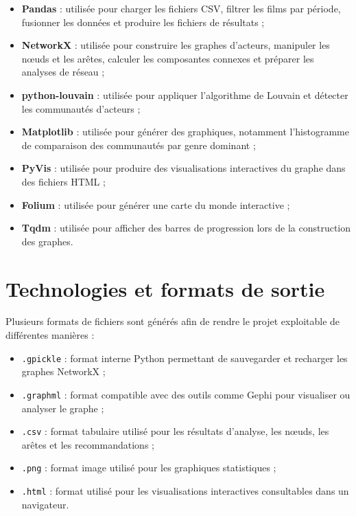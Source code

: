 \documentclass[11pt,a4paper,oneside,openany]{report}
\begin{document}
\begin{itemize}
    \item \textbf{Pandas} : utilisée pour charger les fichiers CSV, filtrer les films par période, fusionner les données et produire les fichiers de résultats ;
    \item \textbf{NetworkX} : utilisée pour construire les graphes d’acteurs, manipuler les nœuds et les arêtes, calculer les composantes connexes et préparer les analyses de réseau ;
    \item \textbf{python-louvain} : utilisée pour appliquer l’algorithme de Louvain et détecter les communautés d’acteurs ;
    \item \textbf{Matplotlib} : utilisée pour générer des graphiques, notamment l’histogramme de comparaison des communautés par genre dominant ;
    \item \textbf{PyVis} : utilisée pour produire des visualisations interactives du graphe dans des fichiers HTML ;
    \item \textbf{Folium} : utilisée pour générer une carte du monde interactive ;
    \item \textbf{Tqdm} : utilisée pour afficher des barres de progression lors de la construction des graphes.
\end{itemize}

\section{Technologies et formats de sortie}

Plusieurs formats de fichiers sont générés afin de rendre le projet exploitable de différentes manières :

\begin{itemize}
    \item \texttt{.gpickle} : format interne Python permettant de sauvegarder et recharger les graphes NetworkX ;
    \item \texttt{.graphml} : format compatible avec des outils comme Gephi pour visualiser ou analyser le graphe ;
    \item \texttt{.csv} : format tabulaire utilisé pour les résultats d’analyse, les nœuds, les arêtes et les recommandations ;
    \item \texttt{.png} : format image utilisé pour les graphiques statistiques ;
    \item \texttt{.html} : format utilisé pour les visualisations interactives consultables dans un navigateur.
\end{itemize}
\end{document}
